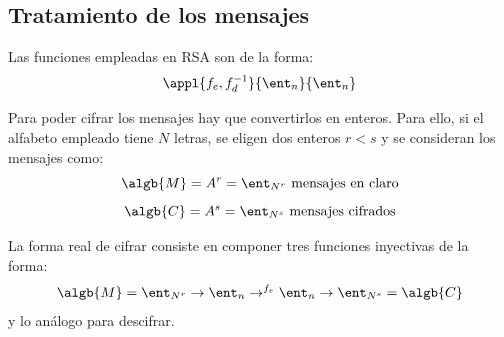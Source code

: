 \subsection{Tratamiento de los mensajes}
Las funciones empleadas en RSA son de la forma:
\[\appl{f_e,f_d^{-1}}{\ent_n}{\ent_n}\]

Para poder cifrar los mensajes hay que convertirlos en enteros. Para ello, si el alfabeto empleado tiene $N$ letras, se eligen dos enteros $r<s$ y se consideran los mensajes como:
\[\algb{M} = A^r = \ent_{N^r} \text{ mensajes en claro}\]
\[\algb{C} = A^s = \ent_{N^s} \text{ mensajes cifrados}\]

La forma real de cifrar consiste en componer tres funciones inyectivas de la forma:
\[\algb{M} = \ent_{N^r} \to \ent_n \to^{f_e} \ent_n \to \ent_{N^s} = \algb{C}\]
y lo análogo para descifrar.

